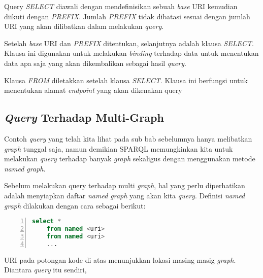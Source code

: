 Query \emph{SELECT} diawali dengan mendefinisikan sebuah \emph{base} URI kemudian diikuti dengan \emph{PREFIX}. Jumlah \emph{PREFIX} tidak dibatasi sesuai dengan jumlah URI yang akan dilibatkan dalam melakukan \emph{query}.

Setelah \emph{base} URI dan \emph{PREFIX} ditentukan, selanjutnya adalah klausa \emph{SELECT}. Klausa ini digunakan untuk melakukan \emph{binding} terhadap data untuk menentukan data apa saja yang akan dikembalikan sebagai hasil \emph{query}.

Klausa \emph{FROM} diletakkan setelah klausa \emph{SELECT}. Klausa ini berfungsi untuk menentukan alamat \emph{endpoint} yang akan dikenakan query

\subsection{\emph{Query} Terhadap Multi-Graph}
Contoh \emph{query} yang telah kita lihat pada sub bab sebelumnya hanya melibatkan \emph{graph} tunggal saja, namun demikian SPARQL memungkinkan kita untuk melakukan \emph{query} terhadap banyak \emph{graph} sekaligus dengan menggunakan metode \emph{named graph}.

Sebelum melakukan query terhadap multi \emph{graph}, hal yang perlu diperhatikan adalah menyiapkan daftar \emph{named graph} yang akan kita \emph{query}. Definisi \emph{named graph} dilakukan dengan cara sebagai berikut:

\begin{lstlisting}[language=SQL, xleftmargin=15pt, numbers=left]
	select *
	from named <uri>
	from named <uri>
	...
\end{lstlisting}

URI pada potongan kode di atas menunjukkan lokasi masing-masig \emph{graph}. Diantara \emph{query} itu sendiri, 